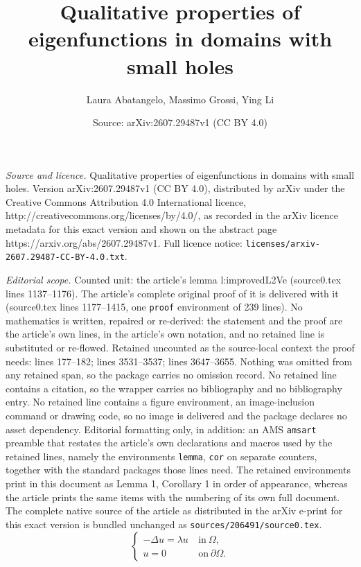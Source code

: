 \documentclass[10pt,a4paper]{amsart}
\title{Qualitative properties of eigenfunctions in domains with small holes}
\author{Laura Abatangelo, Massimo Grossi, Ying Li}
\date{Source: arXiv:2607.29487v1 (CC BY 4.0)}
\begin{document}
\maketitle

\noindent\emph{Source and licence.} Qualitative properties of eigenfunctions in domains with small holes. Version arXiv:2607.29487v1 (CC BY 4.0), distributed by arXiv under the Creative Commons Attribution 4.0 International licence, http://creativecommons.org/licenses/by/4.0/, as recorded in the arXiv licence metadata for this exact version and shown on the abstract page https://arxiv.org/abs/2607.29487v1. Full licence notice: \texttt{licenses/arxiv-2607.29487-CC-BY-4.0.txt}.\par\smallskip

\noindent\textit{Editorial scope.} Counted unit: the article's lemma l:improvedL2Ve (source0.tex lines 1137--1176). The article's complete original proof of it is delivered with it (source0.tex lines 1177--1415, one \texttt{proof} environment of 239 lines). No mathematics is written, repaired or re-derived: the statement and the proof are the article's own lines, in the article's own notation, and no retained line is substituted or re-flowed.  Retained uncounted as the source-local context the proof needs: lines 177--182; lines 3531--3537; lines 3647--3655.  Nothing was omitted from any retained span, so the package carries no omission record.  No retained line contains a citation, so the wrapper carries no bibliography and no bibliography entry.  No retained line contains a figure environment, an image-inclusion command or drawing code, so no image is delivered and the package declares no asset dependency.  Editorial formatting only, in addition: an AMS \texttt{amsart} preamble that restates the article's own declarations and macros used by the retained lines, namely the environments \texttt{lemma}, \texttt{cor} on separate counters, together with the standard packages those lines need.  The retained environments print in this document as Lemma 1, Corollary 1 in order of appearance, whereas the article prints the same items with the numbering of its own full document.  The complete native source of the article as distributed in the arXiv e-print for this exact version is bundled unchanged as \texttt{sources/206491/source0.tex}.
	\begin{equation}\label{eq:eigenvalueproblem}
		\begin{cases}
			-\Delta u=\lambda u~&\mbox{in}\ \Omega,\\
			u=0~&\mbox{on}\ \partial\Omega.
		\end{cases}
	\end{equation}
\end{document}
